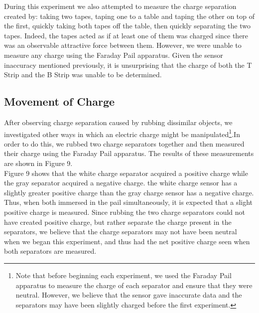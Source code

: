 \documentclass[oneside,12pt]{amsart}
\begin{document}
\indent During this experiment we also attempted to measure the charge separation created by: taking two tapes, taping one to a table and taping the other on top of the first, quickly taking both tapes off the table, then quickly separating the two tapes. Indeed, the tapes acted as if at least one of them was charged since there was an observable attractive force between them. However, we were unable to measure any charge using the Faraday Pail apparatus. Given the sensor inaccuracy mentioned previously, it is unsurprising that the charge of both the T Strip and the B Strip was unable to be determined.\\

\subsection{Movement of Charge}

\indent After observing charge separation caused by rubbing dissimilar objects, we investigated other ways in which an electric charge might be manipulated\footnote{Note that before beginning each experiment, we used the Faraday Pail apparatus to measure the charge of each separator and ensure that they were neutral. However, we believe that the sensor gave inaccurate data and the separators may have been slightly charged before the first experiment. }.In order to do this, we rubbed two charge separators together and then measured their charge using the Faraday Pail apparatus. The results of these measurements are shown in Figure 9.\\


\indent Figure 9 shows that the white charge separator acquired a positive charge while the gray separator acquired a negative charge. the white charge sensor has a slightly greater positive charge than the gray charge sensor has a negative charge. Thus, when both immersed in the pail simultaneously, it is expected that a slight positive charge is measured. Since rubbing the two charge separators could not have created positive charge, but rather separate the charge present in the separators, we believe that the charge separators may not have been neutral when we began this experiment, and thus had the net positive charge seen when both separators are measured.\\
\end{document}
